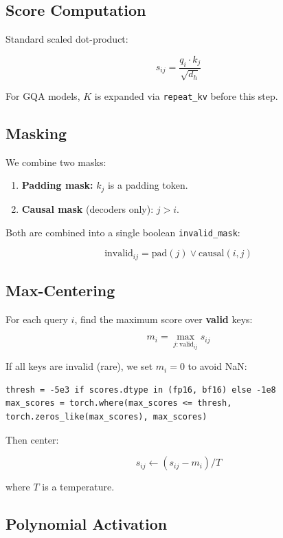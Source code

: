\subsection{Score Computation}

Standard scaled dot-product:

\[
s_{ij} = \frac{q_i \cdot k_j}{\sqrt{d_h}}
\tag{4.1}
\]

For GQA models, $K$ is expanded via \texttt{repeat\_kv} before this step.

\subsection{Masking}

We combine two masks:

\begin{enumerate}
\item \textbf{Padding mask:} $k_j$ is a padding token.
\item \textbf{Causal mask} (decoders only): $j > i$.

\end{enumerate}
Both are combined into a single boolean \texttt{invalid\_mask}:

\[
\text{invalid}_{ij} = \text{pad}(j) \lor \text{causal}(i, j)
\tag{4.2}
\]

\subsection{Max-Centering}

For each query $i$, find the maximum score over \textbf{valid} keys:

\[
m_i = \max_{j: \text{valid}_{ij}} s_{ij}
\tag{4.3}
\]

If all keys are invalid (rare), we set $m_i = 0$ to avoid NaN:

\begin{lstlisting}
thresh = -5e3 if scores.dtype in (fp16, bf16) else -1e8
max_scores = torch.where(max_scores <= thresh, torch.zeros_like(max_scores), max_scores)
\end{lstlisting}

Then center:

\[
s_{ij} \leftarrow (s_{ij} - m_i) / T
\tag{4.4}
\]

where $T$ is a temperature.

\subsection{Polynomial Activation}

